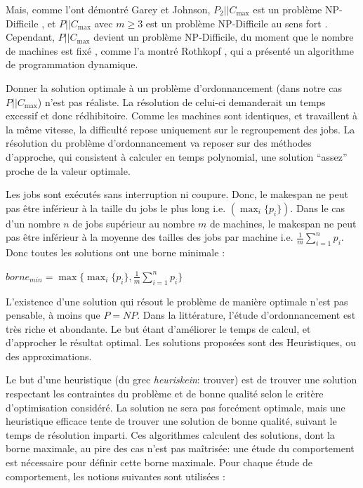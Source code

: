 \documentclass[a4paper,12pt]{report}
\theoremstyle{plain}				%
\theoremstyle{definition}				%
\newcommand\problemGrahamPII{$P_2||C_{\max}$\xspace}	%
\newcommand\problemGrahamP{$P||C_{\max}$\xspace}
\begin{document}
\bigskip
Mais, comme l'ont démontré Garey et Johnson, 
  \problemGrahamPII est un problème NP-Difficile \cite{garey1978strong}, et 
  \problemGrahamP avec $m \geq 3$ est un problème NP-Difficile 
  au sens fort \cite{garey1982computers}. 
Cependant, \problemGrahamP devient un problème NP-Difficile, 
  du moment que le nombre de machines est fixé \cite{chen1999potts}, 
  comme l'a montré Rothkopf \cite{rothkopf1966scheduling}, 
  qui a présenté un algorithme de programmation dynamique.

Donner la solution optimale à un problème d'ordonnancement 
  (dans notre cas \problemGrahamP) n'est pas réaliste. 
  La résolution de celui-ci demanderait un temps excessif et donc rédhibitoire.
Comme les machines sont identiques, et travaillent à la même vitesse,
la difficulté repose uniquement sur le regroupement des jobs.
La résolution du problème d'ordonnancement va reposer sur des méthodes
  d'approche, qui consistent à calculer en temps polynomial,
  une solution ``assez'' proche de la valeur optimale.

Les jobs sont exécutés sans interruption ni coupure. Donc,
  le makespan ne  peut pas être inférieur à la taille du jobs
  le plus long i.e. $(\max_i\{p_i\})$.
  Dans le cas d'un nombre $n$ de jobs supérieur au nombre $m$ de machines,
  le makespan ne peut pas être inférieur à la moyenne
  des tailles des jobs par machine
  i.e. $\frac{1}{m} \sum_{i=1}^{n} p_i$.
Donc toutes les solutions ont une borne minimale
  \cite{mcnaughton1959scheduling}: \\

  \begin{center}
  $borne_{min} = \max \{ \max_i\{p_i\}, \frac{1}{m} \sum_{i=1}^{n} p_i \}$
  \label{borneMini}
  \end{center}

L'existence d'une solution qui résout le problème de manière optimale
  n'est pas pensable, à moins que $P = NP$.
Dans la littérature, l'étude d'ordonnancement est très riche et abondante. 
Le but étant d'améliorer le temps de calcul, et d'approcher le résultat optimal. 
Les solutions proposées sont des Heuristiques, ou des approximations.

Le but d'une heuristique (du grec \emph{heuriskein}: trouver) est 
  de trouver une solution respectant les contraintes du problème et 
  de bonne qualité selon le critère d'optimisation considéré. 
  La solution ne sera pas forcément optimale, 
  mais une heuristique efficace tente de trouver une solution de bonne qualité, 
  suivant le temps de résolution imparti.
Ces algorithmes calculent des solutions, dont la borne maximale, 
  au pire des cas n'est pas maîtrisée: une étude du comportement est nécessaire 
  pour définir cette borne maximale.  
  Pour chaque étude de comportement, les notions suivantes sont utilisées :
\end{document}
